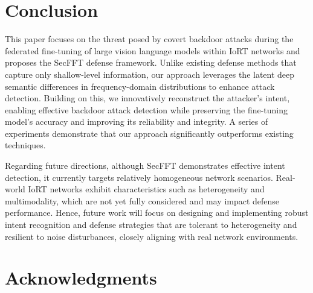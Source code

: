 \documentclass[lettersize,journal]{IEEEtran}
\begin{document}
\section{Conclusion}
This paper focuses on the threat posed by covert backdoor attacks during the federated fine-tuning of large vision language models within IoRT networks and proposes the SecFFT defense framework. Unlike existing defense methods that capture only shallow-level information, our approach leverages the latent deep semantic differences in frequency-domain distributions to enhance attack detection. Building on this, we innovatively reconstruct the attacker’s intent, enabling effective backdoor attack detection while preserving the fine-tuning model's accuracy and improving its reliability and integrity. 
A series of experiments demonstrate that our approach significantly outperforms existing techniques. %

Regarding future directions, although SecFFT demonstrates effective intent detection, it currently targets relatively homogeneous network scenarios. Real-world IoRT networks exhibit characteristics such as heterogeneity and multimodality, which are not yet fully considered and may impact defense performance. Hence, future work will focus on designing and implementing robust intent recognition and defense strategies that are tolerant to heterogeneity and resilient to noise disturbances, closely aligning with real network environments.

\section*{Acknowledgments}
\end{document}
